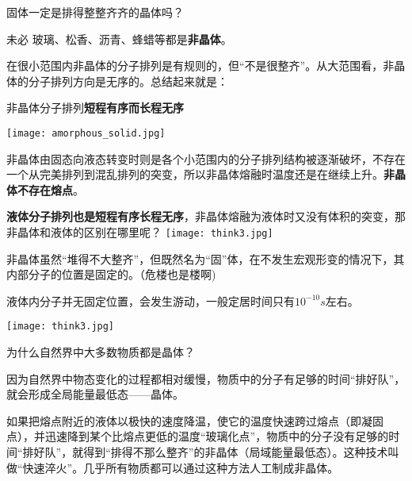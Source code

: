 \documentclass[CJK]{beamer}
\begin{document}
\begin{frame}
\bch
固体一定是排得整整齐齐的晶体吗？

\skiplines

未必 \bye 玻璃、松香、沥青、蜂蜡等都是{\bf 非晶体}。
\ech
\end{frame}

\begin{frame}
\bch
在很小范围内非晶体的分子排列是有规则的，但“不是很整齐”。从大范围看，非晶体的分子排列方向是无序的。总结起来就是：

非晶体分子排列{\bf 短程有序而长程无序}

\skipline
\texttt{[image: amorphous\_solid.jpg]}

非晶体由固态向液态转变时则是各个小范围内的分子排列结构被逐渐破坏，不存在一个从完美排列到混乱排列的突变，所以非晶体熔融时温度还是在继续上升。{\bf 非晶体不存在熔点}。

\ech
\end{frame}

\begin{frame}
\bch
{\bf 液体分子排列也是短程有序长程无序}，非晶体熔融为液体时又没有体积的突变，那非晶体和液体的区别在哪里呢？
\bcenter
\texttt{[image: think3.jpg]}
\ecenter
\ech
\end{frame}

\begin{frame}
\bch
\bitem
\item{非晶体虽然“堆得不大整齐”，但既然名为“固”体，在不发生宏观形变的情况下，其内部分子的位置是固定的。（危楼也是楼啊\wulian)}
\item{液体内分子并无固定位置，会发生游动，一般定居时间只有$10^{-10}s$左右。}
\eitem
\ech
\end{frame}


\begin{frame}
\bch
\bcenter
\texttt{[image: think3.jpg]}
\ecenter

为什么自然界中大多数物质都是晶体？
\ech

\end{frame}


\begin{frame}
\bch
因为自然界中物态变化的过程都相对缓慢，物质中的分子有足够的时间“排好队”，就会形成全局能量最低态——晶体。

\skipline

如果把熔点附近的液体以极快的速度降温，使它的温度快速跨过熔点（即凝固点），并迅速降到某个比熔点更低的温度“玻璃化点”，物质中的分子没有足够的时间“排好队”，就得到“排得不那么整齐”的非晶体（局域能量最低态）。这种技术叫做“快速淬火”。几乎所有物质都可以通过这种方法人工制成非晶体。

\ech

\end{frame}
\end{document}
